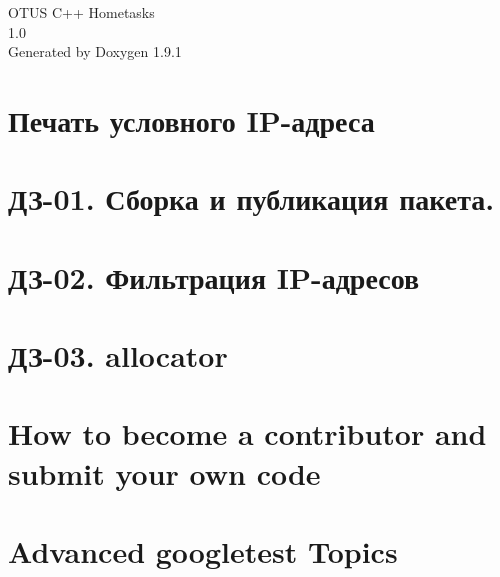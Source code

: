 \let\mypdfximage\pdfximage\def\pdfximage{\immediate\mypdfximage}\documentclass[twoside]{book}
\newcommand{\+}{\discretionary{\mbox{\scriptsize$\hookleftarrow$}}{}{}}
\newcommand{\clearemptydoublepage}{%
  \newpage{\pagestyle{empty}\cleardoublepage}%
}
\begin{document}
\raggedbottom

\hypersetup{pageanchor=false,
             bookmarksnumbered=true,
             pdfencoding=unicode
            }
\begin{titlepage}
\vspace*{7cm}
\begin{center}%
{\Large OTUS C++ Hometasks \\[1ex]\large 1.\+0 }\\
\vspace*{1cm}
{\large Generated by Doxygen 1.9.1}\\
\end{center}
\end{titlepage}
\clearemptydoublepage
{}
\tableofcontents
\clearemptydoublepage
{}
\hypersetup{pageanchor=true}

\chapter{Печать условного IP-\/адреса}
\label{index}\hypertarget{index}{}
\chapter{ДЗ-\/01. Сборка и публикация пакета.}
\label{md_01_task_task}

\chapter{ДЗ-\/02. Фильтрация IP-\/адресов}
\label{md_02_task_task}

\chapter{ДЗ-\/03. allocator}
\label{md_03_task_task}

\chapter{How to become a contributor and submit your own code}
\label{md_04_cmake_build_debug__deps_googletest_src_CONTRIBUTING}

\chapter{Advanced googletest Topics}
\label{md_04_cmake_build_debug__deps_googletest_src_docs_advanced}

\end{document}
